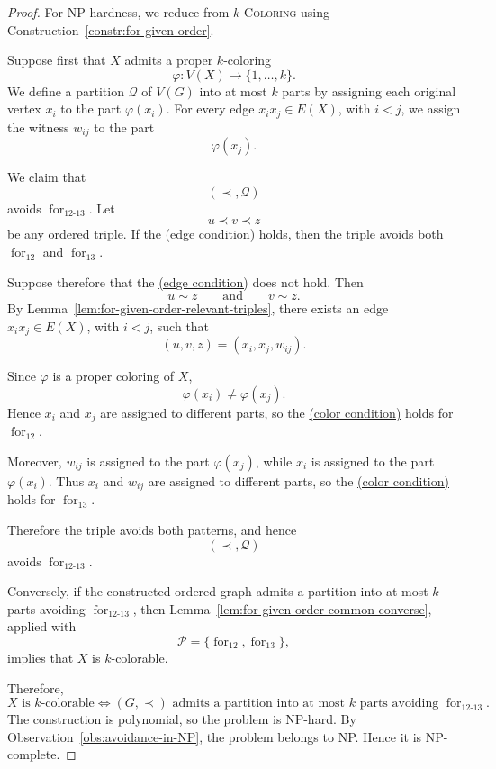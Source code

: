\documentclass[12pt]{article}
\theoremstyle{plain}
\theoremstyle{definition}
\theoremstyle{remark}
\theoremstyle{definition}
\newcommand{\edgecondition}{%
  \hyperref[def:avoid:cond:edge]{(edge condition)}\xspace
}
\newcommand{\colorcondition}{%
  \hyperref[def:avoid:cond:color]{(color condition)}\xspace
}
\newcommand{\forlabel}{\mathrm{for}}
\DeclareRobustCommand{\forparam}[1]{%
  \ensuremath{\mathop{\forlabel}\nolimits_{#1}}%
}
\begin{document}
\begin{proof}
For NP-hardness, we reduce from \(k\)-\textsc{Coloring} using
Construction~\ref{constr:for-given-order}.

Suppose first that \(X\) admits a proper \(k\)-coloring
\[
\varphi:V(X)\to\{1,\dots,k\}.
\]
We define a partition \(\mathcal Q\) of \(V(G)\) into at most \(k\)
parts by assigning each original vertex \(x_i\) to the part
\(\varphi(x_i)\). For every edge \(x_ix_j\in E(X)\), with \(i<j\),
we assign the witness \(w_{ij}\) to the part
\[
\varphi(x_j).
\]

We claim that
\[
(\prec,\mathcal Q)
\]
avoids \(\forparam{12\text{-}13}\). Let
\[
u\prec v\prec z
\]
be any ordered triple. If the \edgecondition{} holds, then the triple
avoids both \(\forparam{12}\) and \(\forparam{13}\).

Suppose therefore that the \edgecondition{} does not hold. Then
\[
u\sim z
\qquad\text{and}\qquad
v\sim z.
\]
By Lemma~\ref{lem:for-given-order-relevant-triples}, there exists an
edge \(x_ix_j\in E(X)\), with \(i<j\), such that
\[
(u,v,z)=(x_i,x_j,w_{ij}).
\]

Since \(\varphi\) is a proper coloring of \(X\),
\[
\varphi(x_i)\neq\varphi(x_j).
\]
Hence \(x_i\) and \(x_j\) are assigned to different parts, so the
\colorcondition{} holds for \(\forparam{12}\).

Moreover, \(w_{ij}\) is assigned to the part \(\varphi(x_j)\), while
\(x_i\) is assigned to the part \(\varphi(x_i)\). Thus \(x_i\) and
\(w_{ij}\) are assigned to different parts, so the \colorcondition{}
holds for \(\forparam{13}\).

Therefore the triple avoids both patterns, and hence
\[
(\prec,\mathcal Q)
\]
avoids \(\forparam{12\text{-}13}\).

Conversely, if the constructed ordered graph admits a partition into
at most \(k\) parts avoiding \(\forparam{12\text{-}13}\), then
Lemma~\ref{lem:for-given-order-common-converse}, applied with
\[
\mathcal P=\{\forparam{12},\forparam{13}\},
\]
implies that \(X\) is \(k\)-colorable.

Therefore,
\[
X\text{ is \(k\)-colorable}
\iff
(G,\prec)\text{ admits a partition into at most \(k\) parts avoiding }
\forparam{12\text{-}13}.
\]
The construction is polynomial, so the problem is NP-hard.
By Observation~\ref{obs:avoidance-in-NP}, the problem belongs to NP.
Hence it is NP-complete.
\end{proof}
\end{document}
